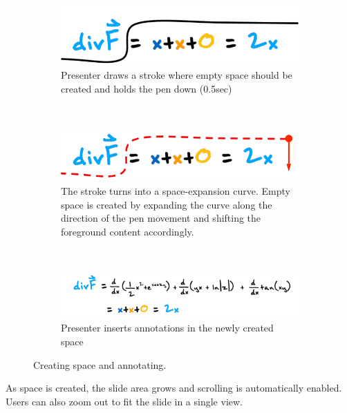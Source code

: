 %
\begin{figure}[h!]
    \centering
    \begin{subfigure}[t]{0.48\columnwidth}
        \centering
        \includegraphics[width=1\columnwidth]{figures/create_space1}
                       \captionsetup{font=footnotesize}
 \caption{Presenter draws a stroke where empty space should be created and holds the pen down (0.5sec)}
    \end{subfigure}%
    ~ 
    \begin{subfigure}[t]{0.48\columnwidth}
        \centering
        \includegraphics[width=1\columnwidth]{figures/create_space2}
                       \captionsetup{font=footnotesize}
 \caption{The stroke turns into a space-expansion curve. Empty space is created by expanding the curve along the direction of the pen movement and shifting the foreground content accordingly.}
    \end{subfigure}
    ~
        \begin{subfigure}[t]{1\columnwidth}
        \centering
        \includegraphics[width=1\columnwidth]{figures/create_space3}
                        \captionsetup{font=footnotesize}
\caption{Presenter inserts annotations in the newly created space }
    \end{subfigure}  
    \caption{Creating space and annotating.}
    \label{fig:space}
\end{figure}
%
As space is created, the slide area grows and scrolling is automatically enabled. Users can also zoom out to fit the slide in a single view.

